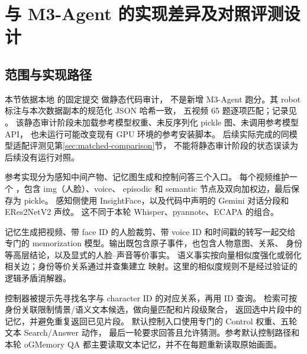 \section{与 M3-Agent 的实现差异及对照评测设计}
\subsection{范围与实现路径}
本节依据本地  的固定提交  做静态代码审计，
不是新增 M3-Agent 跑分。其 robot 标注与本次数据副本的规范化 JSON 哈希一致，
五视频 65 题逐项匹配；记录见 。
该静态审计阶段未加载参考模型权重、未反序列化 pickle 图、未调用参考模型 API，
也未运行可能改变现有 GPU 环境的参考安装脚本。
后续实际完成的同模型适配评测见第\ref{sec:matched-comparison}节，
不能将静态审计阶段的状态误读为后续没有运行对照。

参考实现分为感知中间产物、记忆图生成和控制问答三个入口。
每个视频维护一个 ，包含 img（人脸）、voice、
episodic 和 semantic 节点及双向加权边，最后保存为 pickle。
感知侧使用 InsightFace，以及代码中声明的 Gemini 对话分段和 ERes2NetV2 声纹。
这不同于本轮 Whisper、pyannote、ECAPA 的组合。

记忆生成把视频、带 face ID 的人脸裁剪、带 voice ID 和时间戳的转写一起交给
专门的 memorization 模型。输出既包含原子事件，也包含人物意图、关系、
身份等高层结论，以及显式的人脸--声音等价事实。
语义事实按向量相似度强化或弱化相关边；身份等价关系通过并查集建立
 映射。这里的相似度规则不是经过验证的逻辑矛盾消解器。

控制器被提示先寻找名字与 character ID 的对应关系，再用 ID 查询。
检索可按身份关联限制情景/语义文本候选，做向量匹配和片段级聚合，
返回选中片段中的记忆，并避免重复返回已见片段。
默认控制入口使用专门的 Control 权重、五轮文本 Search/Answer 动作，
最后一轮要求回答且允许猜测。参考默认控制路径和本轮 oGMemory QA
都主要读取文本记忆，并不在每题重新读取原始画面。

